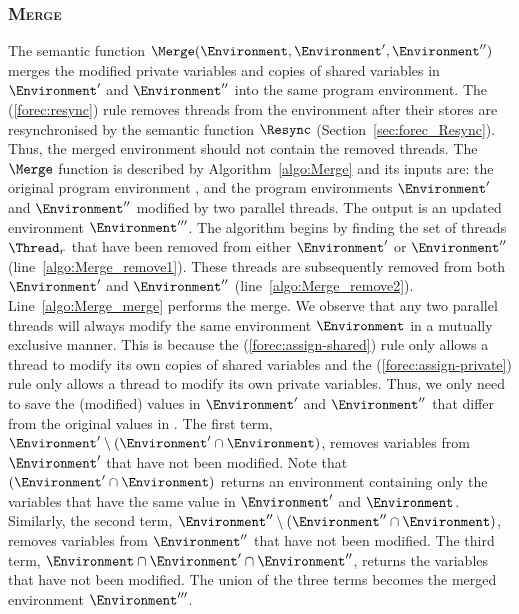 \subsubsection{\textsc{Merge}}
\label{sec:forec_Merge}
The semantic function $\Merge(\Environment, \Environment', \Environment'')$
merges the modified private variables and copies of shared variables in 
$\Environment'$ and $\Environment''$ into the same program environment. 
The (\ref{forec:resync}) rule removes threads from 
the environment after their stores are resynchronised by the semantic 
function $\Resync$ (Section~\ref{sec:forec_Resync}). Thus, the merged 
environment should not contain the removed threads. The $\Merge$ function is 
described by Algorithm~\ref{algo:Merge} and its inputs 
are: the original program environment \Environment{}, and the 
program environments $\Environment'$ and $\Environment''$ modified 
by two parallel threads. The output is an updated environment 
$\Environment'''$. The algorithm begins by finding the set of threads 
$\Thread_r$ that have been removed from either $\Environment'$ or 
$\Environment''$ (line~\ref{algo:Merge_remove1}). These threads are 
subsequently removed from both $\Environment'$ and $\Environment''$ 
(line~\ref{algo:Merge_remove2}). Line~\ref{algo:Merge_merge} performs 
the merge. We observe that any two parallel threads will always
modify the same environment $\Environment$ in a mutually exclusive
manner. This is because the (\ref{forec:assign-shared}) rule only 
allows a thread to modify its own copies of shared variables and the 
(\ref{forec:assign-private}) rule only allows a thread to modify its 
own private variables. Thus, we only need to save the (modified) 
values in $\Environment'$ and $\Environment''$ that differ from 
the original values in \Environment{}. The first term,
$\Environment' \setminus (\Environment' \cap \Environment)$, removes 
variables from $\Environment'$ that have not been modified. Note that
$(\Environment' \cap \Environment)$ returns an environment 
containing only the variables that have the same value in $\Environment'$ 
and $\Environment$. Similarly, the second term, 
$\Environment'' \setminus (\Environment'' \cap \Environment)$, removes 
variables from $\Environment''$ that have not been modified. The third
term, $\Environment \cap \Environment' \cap \Environment''$, returns 
the variables that have not been modified. The union of the three 
terms becomes the merged environment $\Environment'''$.

